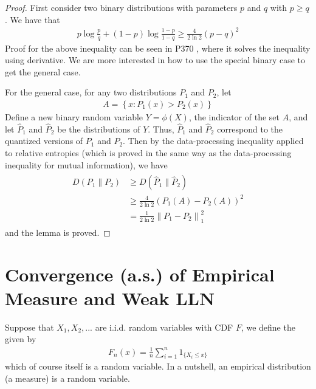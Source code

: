\documentclass{article}
\begin{document}
\begin{proof}
First consider two binary distributions with parameters $p$ and $q$ with $p \geq q$. We have that
\begin{align*}
p \log \frac{p}{q}+(1-p) \log \frac{1-p}{1-q} \geq \frac{4}{2 \ln 2}(p-q)^{2}
\end{align*}
Proof for the above inequality can be seen in P370 \cite{cover1999elements}, where it solves the inequality using derivative. We are more interested in how to use the special binary case to get the general  case.

 For the general case, for any two distributions $P_{1}$ and $P_{2}$, let
\begin{align*}
A=\left\{x: P_{1}(x)>P_{2}(x)\right\}
\end{align*}
Define a new binary random variable $Y=\phi(X)$, the indicator of the set $A$, and let $\hat{P}_{1}$ and $\hat{P}_{2}$ be the distributions of $Y$. Thus, $\hat{P}_{1}$ and $\hat{P}_{2}$ correspond to the quantized versions of $P_{1}$ and $P_{2}$. Then by the data-processing
inequality applied to relative entropies (which is proved in the same way as the data-processing inequality for mutual information), we have
\begin{align*}
\begin{aligned}
D\left(P_{1} \| P_{2}\right) & \geq D\left(\hat{P}_{1} \| \hat{P}_{2}\right) \\
& \geq \frac{4}{2 \ln 2}\left(P_{1}(A)-P_{2}(A)\right)^{2} \\
&=\frac{1}{2 \ln 2}\left\|P_{1}-P_{2}\right\|_{1}^{2}
\end{aligned}
\end{align*}
and the lemma is proved.
\end{proof} 

\section{Convergence (a.s.) of Empirical Measure and Weak LLN}
\begin{defa}{}
Suppose that $X_{1}, X _{2},...$ are i.i.d. random variables with CDF $F$, we define the  given by
\begin{align*}
F_{n}(x)=\frac{1}{n} \sum_{i=1}^{n} 1_{\{X_i\leq  x\}}
\end{align*}
which of course itself is a random variable. In a nutshell, an empirical distribution (a measure) is a random variable.
\end{defa}
\end{document}
